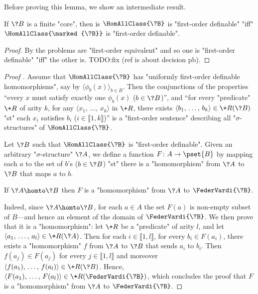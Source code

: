 Before proving this lemma, we show an intermediate result.
\begin{fact}
	\AP\label{fact:marking-preserves-finite-duality}
	If $\?B$ is a finite "core", then is $\HomAllClass{\?B}$ is "first-order definable"
	"iff" $\HomAllClass{\marked{\?B}}$ is "first-order definable".
\end{fact}

\begin{proof}
	By  the problems are "first-order equivalent" and so
	one is "first-order definable" "iff" the other is. TODO:fix (ref is about decision pb).
\end{proof}

\begin{proof}[Proof ]
	 Assume that $\HomAllClass{\?B}$ has
	"uniformly first-order definable homomorphisms", say by $\langle \phi_b(x) \rangle_{b\in B}$.
	Then the conjunctions of the properties 
	``every $x$ must satisfy exactly one $\phi_b(x)$ ($b\in \?B$)'',
	and ``for every "predicate" $\+R$ of arity $k$, for any $\langle x_1,\, \hdots,\, x_k \rangle$ in $\+R$, there exists $\langle b_1,\, \hdots,\, b_k \rangle \in \+R(\?B)$ "st"
	each $x_i$ satisfies $b_i$ ($i \in \lBrack 1,k \rBrack$)'' is a "first-order sentence"
	describing all "$\sigma$-structures" of $\HomAllClass{\?B}$.

	Let $\?B$ such that $\HomAllClass{\?B}$ is "first-order definable".
	Given an arbitrary "$\sigma$-structure" $\?A$, we define a function $F\colon A \to \pset{B}$
	by mapping each $a$ to the set of $b$'s ($b \in \?B$) "st"
	there is a "homomorphism" from $\?A$ to $\?B$ that maps $a$ to $b$.
	\begin{claim}
		\label{claim:finite-duality-uniformly-definable-homomorphisms-homomorphism}
		If $\?A \homto \?B$ then $F$ is a "homomorphism" from $\?A$ to $\FederVardi{\?B}$.
	\end{claim}
	Indeed, since $\?A\homto\?B$, for each $a\in A$ the set
	$F(a)$ is non-empty subset of $B$---and hence an element of the domain of $\FederVardi{\?B}$.
	We then prove that it is a "homomorphism": let $\+R$ be a "predicate" of arity $l$,
	and let $\langle a_1,\,\hdots,\,a_l \rangle \in \+R(\?A)$. Then for each $i \in \lBrack 1,l\rBrack$, for every $b_i \in F(a_i)$, there exists a "homomorphism" $f$ from $\?A$ to $\?B$
	that sends $a_i$ to $b_i$. Then $f(a_j) \in F(a_j)$ for every $j\in \lBrack 1,l\rBrack$
	and moreover $\langle f(a_1),\,\hdots,\, f(a_l) \rangle \in \+R(\?B)$.
	Hence, $\langle F(a_1),\,\hdots,\,F(a_l) \rangle \in \+R(\FederVardi{\?B})$,
	which concludes the proof that $F$ is a "homomorphism" from $\?A$ to $\FederVardi{\?B}$.


\end{proof}
